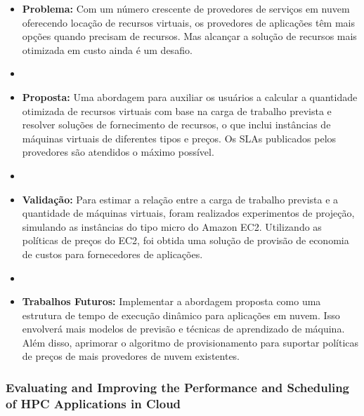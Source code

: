 \documentclass[tese,capa]{texufpel}
\begin{document}
\begin{itemize}[label={},noitemsep]
  \item \textbf{Problema:} Com um número crescente de provedores de serviços em nuvem oferecendo locação de recursos virtuais, os provedores de aplicações têm mais opções quando precisam de recursos. Mas alcançar a solução de recursos mais otimizada em custo ainda é um desafio.
  \item 
  \item \textbf{Proposta:} Uma abordagem para auxiliar os usuários a calcular a quantidade otimizada de recursos virtuais com base na carga de trabalho prevista e resolver soluções de fornecimento de recursos, o que inclui instâncias de máquinas virtuais de diferentes tipos e preços. Os SLAs publicados pelos provedores são atendidos o máximo possível.
  \item 
  \item \textbf{Validação:} Para estimar a relação entre a carga de trabalho prevista e a quantidade de máquinas virtuais, foram realizados experimentos de projeção, simulando as instâncias do tipo micro do Amazon EC2. Utilizando as políticas de preços do EC2, foi obtida uma solução de provisão de economia de custos para fornecedores de aplicações.
  \item 
  \item \textbf{Trabalhos Futuros:} Implementar a abordagem proposta como uma estrutura de tempo de execução dinâmico para aplicações em nuvem. Isso envolverá mais modelos de previsão e técnicas de aprendizado de máquina. Além disso, aprimorar o algoritmo de provisionamento para suportar políticas de preços de mais provedores de nuvem existentes. 
\end{itemize}

\subsubsection{Evaluating and Improving the Performance and Scheduling of HPC Applications in Cloud \cite{guptaEvaluatingImprovingPerformance2016d}}
\end{document}
